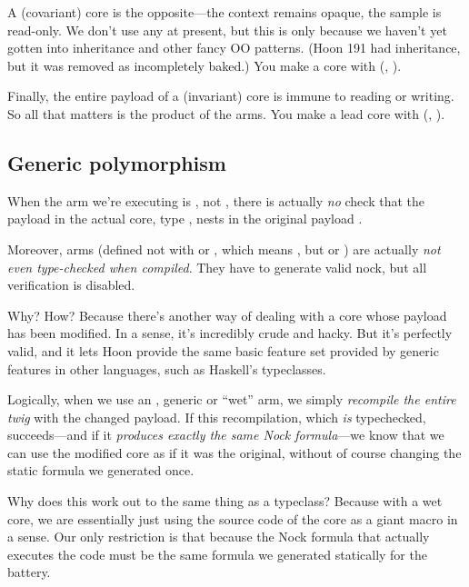 A  (covariant) core is the opposite---the context remains
opaque, the sample is read-only.  We don't use any  at
present, but this is only because we haven't yet gotten into
inheritance and other fancy OO patterns.  (Hoon 191 had
inheritance, but it was removed as incompletely baked.) You make
a  core  with \kode{\ket \&} (, ).

Finally, the entire payload of a  (invariant) core is
immune to reading or writing.  So all that matters is the product
of the arms.  You make a lead core with  (, ).

\subsection{Generic polymorphism}

When the arm we're executing is , not , there is
actually \emph{no} check that the payload in the actual core, type
, nests in the original payload .

Moreover,  arms (defined not with \kode{++} or , which
means , but \kode{+-} or ) are actually \emph{not even
type-checked when compiled}.  They have to generate valid nock,
but all verification is disabled.

Why?  How?  Because there's another way of dealing with a core
whose payload has been modified.  In a sense, it's incredibly
crude and hacky.  But it's perfectly valid, and it lets Hoon
provide the same basic feature set provided by generic features
in other languages, such as Haskell's typeclasses.

Logically, when we use an , generic or ``wet'' arm, we simply
\emph{recompile the entire twig} with the changed payload.  If this
recompilation, which \emph{is} typechecked, succeeds---and if it
\emph{produces exactly the same Nock formula}---we know that we can
use the modified core as if it was the original, without of
course changing the static formula we generated once.

Why does this work out to the same thing as a typeclass?  Because
with a wet core, we are essentially just using the source code of
the core as a giant macro in a sense.  Our only restriction is
that because the Nock formula that actually executes the code
must be the same formula we generated statically for the battery.

